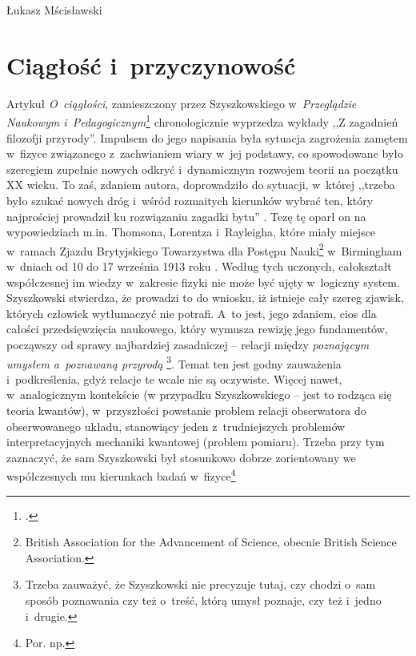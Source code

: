\begin{artplenv}{Łukasz Mścisławski}
\section{Ciągłość i~przyczynowość}
Artykuł \textit{O~ciągłości}, zamieszczony przez Szyszkowskiego w~\textit{Przeglądzie Naukowym i~Pedagogicznym}\footnote{
\parencite[][]{szyszkowski_o_1916}.%
} chronologicznie wyprzedza wykłady ,,Z zagadnień filozofji przyrody''. Impulsem do jego napisania była sytuacja zagrożenia zamętem w~fizyce związanego z~zachwianiem wiary w~jej podstawy, co spowodowane było szeregiem zupełnie nowych odkryć i~dynamicznym rozwojem teorii na początku XX wieku. To zaś, zdaniem autora, doprowadziło do sytuacji, w~której ,,trzeba było szukać nowych dróg i~wśród rozmaitych kierunków wybrać ten, który najprościej prowadził ku rozwiązaniu zagadki bytu'' 
\parencite[][s.~44]{szyszkowski_o_1916}. %
 Tezę tę oparł on na wypowiedziach m.in. Thomsona, Lorentza i~Rayleigha, które miały miejsce w~ramach Zjazdu Brytyjskiego Towarzystwa dla Postępu Nauki\footnote{British Association for the Advancement of Science, obecnie British Science Association.} w~Birmingham w~dniach od 10 do 17 września 1913 roku 
\parencite[por.][]{british_association_for_the_advancement_of_science_report_1914}. %
 Według tych uczonych, całokształt współczesnej im wiedzy w~zakresie fizyki nie może być ujęty w~logiczny system. Szyszkowski stwierdza, że prowadzi to do wniosku, iż istnieje cały szereg zjawisk, których człowiek wytłumaczyć nie potrafi. A~to jest, jego zdaniem, cios dla całości przedsięwzięcia naukowego, który wymusza rewizję jego fundamentów, począwszy od sprawy najbardziej zasadniczej -- relacji między \textit{poznającym umysłem a~poznawaną przyrodą} 
\parencite[][s.~44]{szyszkowski_o_1916}%
\footnote{Trzeba zauważyć, że Szyszkowski nie precyzuje tutaj, czy chodzi o~sam sposób poznawania czy też o~treść, którą umysł poznaje, czy też i~jedno i~drugie.}. Temat ten jest godny zauważenia i~podkreślenia, gdyż relacje te wcale nie są oczywiste. Więcej nawet, w~analogicznym kontekście (w przypadku Szyszkowskiego -- jest to rodząca się teoria kwantów), w~przyszłości powstanie problem relacji obserwatora do obserwowanego układu, stanowiący jeden z~trudniejszych problemów interpretacyjnych mechaniki kwantowej (problem pomiaru). Trzeba przy tym zaznaczyć, że sam Szyszkowski był stosunkowo dobrze zorientowany we współczesnych mu kierunkach badań w~fizyce\footnote{Por. np. 
}
\end{artplenv}
